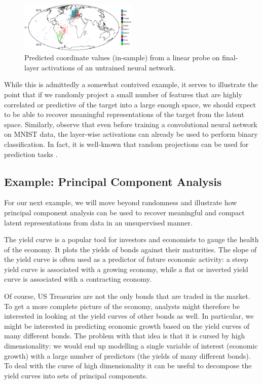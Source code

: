 \documentclass{article}
\theoremstyle{plain}
\theoremstyle{definition}
\theoremstyle{remark}
\begin{document}
\begin{figure}

{\centering \includegraphics[width=0.5\textwidth]{results/figures/map.png}

}

\caption{\label{fig-map}Predicted coordinate values (in-sample) from a linear probe on final-layer activations of an untrained neural network.}

\end{figure}

While this is admittedly a somewhat contrived example, it serves to illustrate the point that if we randomly project a small number of features that are highly correlated or predictive of the target into a large enough space, we should expect to be able to recover meaningful representations of the target from the latent space. Similarly, \cite{alain2018understanding} observe that even before training a convolutional neural network on MNIST data, the layer-wise activations can already be used to perform binary classification. In fact, it is well-known that random projections can be used for prediction tasks \cite{dasgupta2013experiments}.

\subsection{Example: Principal Component
Analysis}\label{example-principal-component-analysis}

For our next example, we will move beyond randomness and illustrate how principal component analysis can be used to recover meaningful and compact latent representations from data in an unsupervised manner. 

The yield curve is a popular tool for investors and economists to gauge the health of the economy. It plots the yields of bonds against their maturities. The slope of the yield curve is often used as a predictor of future economic activity: a steep yield curve is associated with a growing economy, while a flat or inverted yield curve is associated with a contracting economy.

Of course, US Treasuries are not the only bonds that are traded in the market. To get a more complete picture of the economy, analysts might
therefore be interested in looking at the yield curves of other bonds as
well. In particular, we might be interested in predicting economic
growth based on the yield curves of many different bonds. The problem
with that idea is that it is cursed by high dimensionality: we would end
up modelling a single variable of interest (economic growth) with a
large number of predictors (the yields of many different bonds). To deal
with the curse of high dimensionality it can be useful to decompose the
yield curves into sets of principal components.
\end{document}
